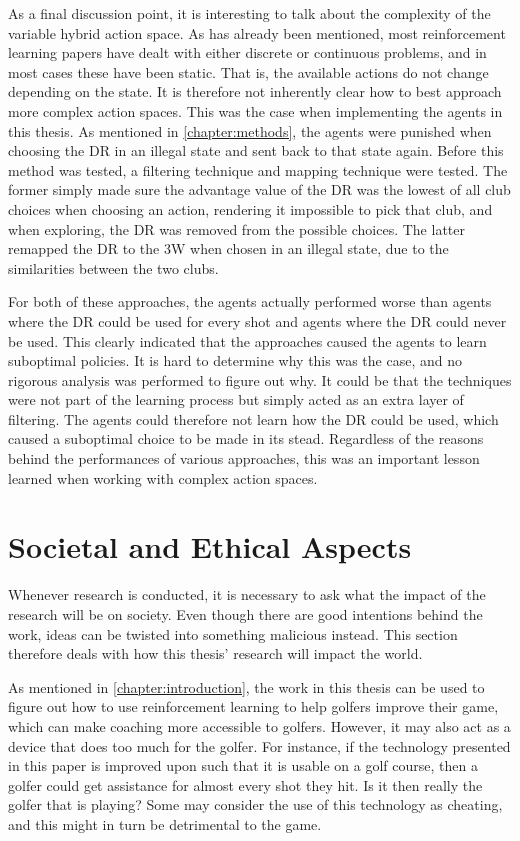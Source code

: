 \documentclass{kththesis}
\begin{document}
As a final discussion point, it is interesting to talk about the complexity of the variable hybrid action space. As has already been mentioned, most reinforcement learning papers have dealt with either discrete or continuous problems, and in most cases these have been static. That is, the available actions do not change depending on the state. It is therefore not inherently clear how to best approach more complex action spaces. This was the case when implementing the agents in this thesis. As mentioned in \autoref{chapter:methods}, the agents were punished when choosing the DR in an illegal state and sent back to that state again. Before this method was tested, a filtering technique and mapping technique were tested. The former simply made sure the advantage value of the DR was the lowest of all club choices when choosing an action, rendering it impossible to pick that club, and when exploring, the DR was removed from the possible choices. The latter remapped the DR to the 3W when chosen in an illegal state, due to the similarities between the two clubs. 

For both of these approaches, the agents actually performed worse than agents where the DR could be used for every shot and agents where the DR could never be used. This clearly indicated that the approaches caused the agents to learn suboptimal policies. It is hard to determine why this was the case, and no rigorous analysis was performed to figure out why. It could be that the techniques were not part of the learning process but simply acted as an extra layer of filtering. The agents could therefore not learn how the DR could be used, which caused a suboptimal choice to be made in its stead. Regardless of the reasons behind the performances of various approaches, this was an important lesson learned when working with complex action spaces.

\section{Societal and Ethical Aspects}
Whenever research is conducted, it is necessary to ask what the impact of the research will be on society. Even though there are good intentions behind the work, ideas can be twisted into something malicious instead. This section therefore deals with how this thesis' research will impact the world.

As mentioned in \autoref{chapter:introduction}, the work in this thesis can be used to figure out how to use reinforcement learning to help golfers improve their game, which can make coaching more accessible to golfers. However, it may also act as a device that does too much for the golfer. For instance, if the technology presented in this paper is improved upon such that it is usable on a golf course, then a golfer could get assistance for almost every shot they hit. Is it then really the golfer that is playing? Some may consider the use of this technology as cheating, and this might in turn be detrimental to the game.
\end{document}
